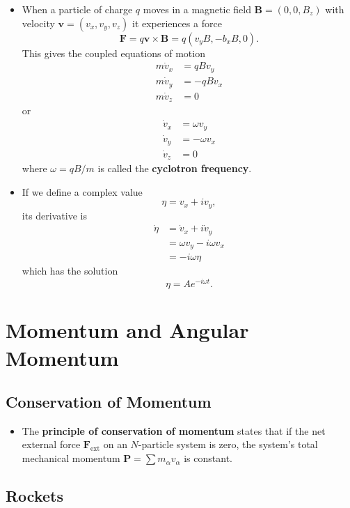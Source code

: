 \documentclass{article}
\renewcommand{\vec}[1]{\boldsymbol{\mathbf{#1}}}
\begin{document}
\begin{itemize}
  \item When a particle of charge $q$ moves in a magnetic field $\vec{B} = (0, 0, B_z)$ with velocity $\vec{v} = (v_x, v_y, v_z)$ it experiences a force \[\vec{F} = q \vec{v} \times \vec{B} = q (v_y B, -b_x B, 0).\] This gives the coupled equations of motion \begin{align*}
          m \dot{v}_x & = q B v_y  \\
          m \dot{v}_y & = -q B v_x \\
          m \dot{v}_z & = 0
        \end{align*} or \begin{align*}
          \dot{v}_x & = \omega v_y  \\
          \dot{v}_y & = -\omega v_x \\
          \dot{v}_z & = 0
        \end{align*} where $\omega = q B / m$ is called the \textbf{cyclotron frequency}.

  \item If we define a complex value \[\eta = v_x + i v_y,\] its derivative is \begin{align*}
          \dot{\eta} & = \dot{v}_x + i \dot{v}_y   \\
                     & = \omega v_y - i \omega v_x \\
                     & = -i \omega \eta
        \end{align*} which has the solution \[\eta = A e^{-i \omega t}.\]
\end{itemize}

\section{Momentum and Angular Momentum}

\subsection{Conservation of Momentum}

\begin{itemize}
  \item The \textbf{principle of conservation of momentum} states that if the net external force $\vec{F}_\text{ext}$ on an $N$-particle system is zero, the system's total mechanical momentum $\vec{P} = \sum m_\alpha v_\alpha$ is constant.
\end{itemize}

\subsection{Rockets}
\end{document}
